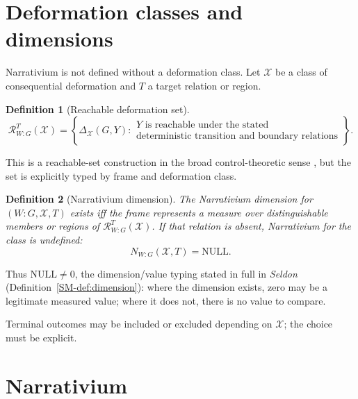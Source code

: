 \documentclass[11pt,a4paper]{article}
\newtheorem{definition}{Definition}[section]
\theoremstyle{remark}
\newcommand{\Null}{\mathrm{NULL}}
\begin{document}
\section{Deformation classes and dimensions}\label{sec:deformation-class}

Narrativium is not defined without a deformation class. Let $\mathcal X$ be a class of consequential deformation and $T$ a target relation or region.

\begin{definition}[Reachable deformation set]\label{def:reachable-deformation}
\[
\mathcal R_{W:G}^T(\mathcal X)
=
\left\{
\Delta_{\mathcal X}(G,Y):
\begin{array}{l}
Y\text{ is reachable under the stated}\\
\text{deterministic transition and boundary relations}
\end{array}
\right\}.
\]
\end{definition}

This is a reachable-set construction in the broad control-theoretic sense \citep{kalman1960control,aubin1991viability}, but the set is explicitly typed by frame and deformation class.

\begin{definition}[Narrativium dimension]\label{def:n-dimension}
The Narrativium dimension for $(W:G,\mathcal X,T)$ exists iff the frame represents a measure over distinguishable members or regions of $\mathcal R_{W:G}^T(\mathcal X)$. If that relation is absent, Narrativium for the class is undefined:
\[
N_{W:G}(\mathcal X,T)=\Null.
\]
\end{definition}

Thus $\Null\neq0$, the dimension/value typing stated in full in \emph{Seldon} (Definition~\ref{SM-def:dimension}): where the dimension exists, zero may be a legitimate measured value; where it does not, there is no value to compare.

Terminal outcomes may be included or excluded depending on $\mathcal X$; the choice must be explicit.

\section{Narrativium}\label{sec:narrativium}
\end{document}
